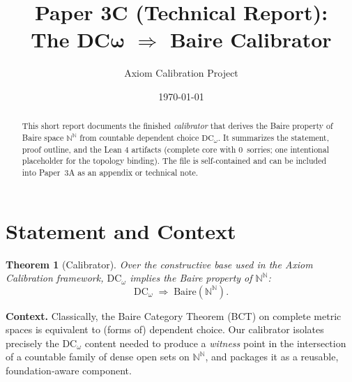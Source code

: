 \documentclass[11pt]{article}
\title{\vspace{-1ex}Paper 3C (Technical Report): \\
  \smallskip
  \Large The DC$\boldsymbol{\omega}$ $\Rightarrow$ Baire Calibrator}
\author{\small Axiom Calibration Project}
\date{\small \today}
\newcommand{\NN}{\mathbb{N}}
\newcommand{\Seq}{\NN^{\NN}}  %
\newcommand{\DCw}{\mathrm{DC}_\omega}
\newcommand{\BaireNN}{\mathrm{Baire}(\NN^\NN)}
\theoremstyle{definition}
\theoremstyle{plain}
\newtheorem{theorem}{Theorem}
\begin{document}
\maketitle
\vspace{-1.25ex}

\begin{abstract}\noindent
This short report documents the finished \emph{calibrator} that derives the
Baire property of Baire space $\Seq$ from countable dependent choice $\DCw$.
It summarizes the statement, proof outline, and the Lean 4 artifacts
(complete core with $0$~sorries; one intentional placeholder for the topology
binding). The file is self-contained and can be included into Paper~3A as an
appendix or technical note.
\end{abstract}

\section{Statement and Context}
\label{sec:statement}
\begin{theorem}[Calibrator]\label{thm:dcw-baire}
Over the constructive base used in the Axiom Calibration framework,
$\DCw$ implies the Baire property of $\Seq$:
\[
\DCw \;\Rightarrow\; \BaireNN.
\]
\end{theorem}

\noindent
\textbf{Context.} Classically, the Baire Category Theorem (BCT) on complete
metric spaces is equivalent to (forms of) dependent choice. Our calibrator
isolates precisely the $\DCw$ content needed to produce a \emph{witness}
point in the intersection of a countable family of dense open sets on
$\Seq$, and packages it as a reusable, foundation‑aware component.
\end{document}
